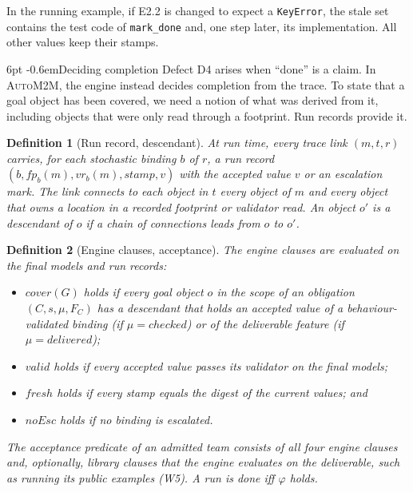 \documentclass[pdflatex,sn-mathphys-num]{sn-jnl}
\makeatletter
\theoremstyle{thmstyleone}%
\theoremstyle{thmstyletwo}%
\theoremstyle{thmstylethree}%
\newtheorem{definition}{Definition}%
\newcommand{\auto}{\textsc{AutoM2M}}
\newcommand{\W}[1]{\textsf{W#1}}
\newcommand{\D}[1]{\textsf{D#1}}
\newcommand{\fp}{\mathit{fp}}
\newcommand{\code}[1]{\texttt{#1}}
\renewcommand\paragraph{\@startsection{paragraph}{4}{\z@}%
  {6pt \@plus 2pt \@minus 1pt}{-0.6em}{\normalfont\normalsize\bfseries}}
\makeatother
\begin{document}
In the running example, if E2.2 is changed to expect a \code{KeyError}, the
stale set contains the test code of \code{mark\_done} and, one step later, its
implementation. All other values keep their stamps.

\paragraph{Deciding completion} Defect \D{4} arises when ``done'' is a claim.
In \auto{}, the engine instead decides completion from the trace. To state that
a goal object has been covered, we need a notion of what was derived from it,
including objects that were only read through a footprint. Run records provide
it.

\begin{definition}[Run record, descendant]\label{def:record}
At run time, every trace link $(m,t,r)$ carries, for each stochastic binding
$b$ of $r$, a \emph{run record} $(b,\fp_b(m),\mathit{vr}_b(m),\mathit{stamp},v)$
with the accepted value $v$ or an escalation mark. The link \emph{connects} to
each object in $t$ every object of $m$ and every object that owns a location in
a recorded footprint or validator read. An object $o'$ is a \emph{descendant}
of $o$ if a chain of connections leads from $o$ to $o'$.
\end{definition}

\begin{definition}[Engine clauses, acceptance]\label{def:accept}
The \emph{engine clauses} are evaluated on the final models and run records:
\begin{itemize}[leftmargin=1.3em, itemsep=1pt, topsep=2pt]
\item $\mathit{cover}(G)$ holds if every goal object $o$ in the scope of an
obligation $(C,s,\mu,F_C)$ has a descendant that holds an accepted value of a
behaviour-validated binding (if $\mu=\mathit{checked}$) or of the deliverable
feature (if $\mu=\mathit{delivered}$);
\item $\mathit{valid}$ holds if every accepted value passes its validator on the
final models;
\item $\mathit{fresh}$ holds if every stamp equals the digest of the current
values; and
\item $\mathit{noEsc}$ holds if no binding is escalated.
\end{itemize}
The acceptance predicate of an admitted team consists of all four engine
clauses and, optionally, \emph{library clauses} that the engine evaluates on the
deliverable, such as running its public examples (\W{5}). A run is
\emph{done} iff $\varphi$ holds.
\end{definition}
\end{document}
